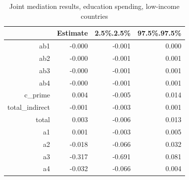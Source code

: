 \begin{table}[ht]
\centering
\begin{tabular}{rrrr}
  \hline
 & Estimate & 2.5\%.2.5\% & 97.5\%.97.5\% \\ 
  \hline
ab1 & -0.000 & -0.001 & 0.000 \\ 
  ab2 & -0.000 & -0.001 & 0.001 \\ 
  ab3 & -0.000 & -0.001 & 0.001 \\ 
  ab4 & -0.000 & -0.001 & 0.001 \\ 
  c\_prime & 0.004 & -0.005 & 0.014 \\ 
  total\_indirect & -0.001 & -0.003 & 0.001 \\ 
  total & 0.003 & -0.006 & 0.013 \\ 
  a1 & 0.001 & -0.003 & 0.005 \\ 
  a2 & -0.018 & -0.066 & 0.032 \\ 
  a3 & -0.317 & -0.691 & 0.081 \\ 
  a4 & -0.032 & -0.066 & 0.004 \\ 
   \hline
\end{tabular}
\caption{Joint mediation results, education spending, low-income countries} 
\end{table}
